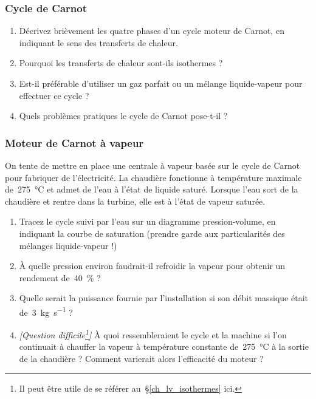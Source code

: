 \subsubsection{Cycle de Carnot}

	\begin{enumerate}
	
		\item Décrivez brièvement les quatre phases d’un cycle moteur de Carnot, en indiquant le sens des transferts de chaleur.
	
		\item Pourquoi les transferts de chaleur sont-ils isothermes ?
		
		\item Est-il préférable d’utiliser un gaz parfait ou un mélange liquide-vapeur pour effectuer ce cycle ?
		
		\item Quels problèmes pratiques le cycle de Carnot pose-t-il ? 

	\end{enumerate}


\subsubsection{Moteur de Carnot à vapeur}

	On tente de mettre en place une centrale à vapeur basée sur le cycle de Carnot pour fabriquer de l’électricité. La chaudière fonctionne à température maximale de~\SI{275}{\degreeCelsius} et admet de l’eau à l’état de liquide saturé. Lorsque l’eau sort de la chaudière et rentre dans la turbine, elle est à l’état de vapeur saturée.
	
	\begin{enumerate}
	
		\item Tracez le cycle suivi par l’eau sur un diagramme pression-volume, en indiquant la courbe de saturation (prendre garde aux particularités des mélanges liquide-vapeur !)
		
		\item À quelle pression environ faudrait-il refroidir la vapeur pour obtenir un rendement de~\SI{40}{\percent} ?
		
		\item Quelle serait la puissance fournie par l’installation si son débit massique était de~\SI{3}{\kilogram\per\second} ?
		
		\item \textit{[Question difficile\footnote{Il peut être utile de se référer au~\S\ref{ch_lv_isothermes} ici.}]} À quoi ressembleraient le cycle et la machine si l’on continuait à chauffer la vapeur à température constante de~\SI{275}{\degreeCelsius} à la sortie de la chaudière ? Comment varierait alors l’efficacité du moteur ?
		
	\end{enumerate}


